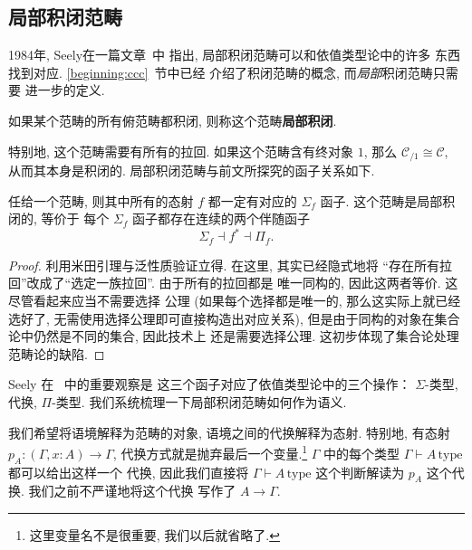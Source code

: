 \subsection{局部积闭范畴}
1984年, Seely在一篇文章~\cite{seely:1984:lccc}中
指出, 局部积闭范畴可以和依值类型论中的许多
东西找到对应. \ref{beginning:ccc}~节中已经
介绍了积闭范畴的概念, 而\emph{局部}积闭范畴只需要
进一步的定义.
\begin{definition}
如果某个范畴的所有俯范畴都积闭, 则称这个范畴\textbf{局部积闭}.
\end{definition}
特别地, 这个范畴需要有所有的拉回. 如果这个范畴含有终对象
\(1\), 那么 \(\mathcal C_{/1} \cong \mathcal C\),
从而其本身是积闭的. 局部积闭范畴与前文所探究的函子关系如下.
\begin{theorem}
任给一个范畴, 则其中所有的态射 \(f\) 都一定有对应的
\(\Sigma_f\) 函子. 这个范畴是局部积闭的, 等价于
每个 \(\Sigma_f\) 函子都存在连续的两个伴随函子
\[\Sigma_f\dashv f^*\dashv \Pi_f.\]
\end{theorem}
\begin{proof}
利用米田引理与泛性质验证立得. 在这里, 其实已经隐式地将
“存在所有拉回”改成了“选定一族拉回”. 由于所有的拉回都是
唯一同构的, 因此这两者等价. 这尽管看起来应当不需要选择
公理 (如果每个选择都是唯一的, 那么这实际上就已经选好了,
无需使用选择公理即可直接构造出对应关系),
但是由于同构的对象在集合论中仍然是不同的集合, 因此技术上
还是需要选择公理. 这初步体现了集合论处理范畴论的缺陷.
\end{proof}
Seely 在 \cite{seely:1984:lccc}~中的重要观察是
这三个函子对应了依值类型论中的三个操作：
\(\Sigma\)-类型, 代换, \(\Pi\)-类型.
我们系统梳理一下局部积闭范畴如何作为语义.

我们希望将语境解释为范畴的对象, 语境之间的代换解释为态射.
特别地, 有态射 \(p_A : (\Gamma, x{:}A) \to \Gamma\),
代换方式就是抛弃最后一个变量.\footnote{这里变量名不是很重要,
我们以后就省略了.} \(\Gamma\) 中的每个类型
\(\Gamma \vdash A\,\text{type}\) 都可以给出这样一个
代换, 因此我们直接将 \(\Gamma \vdash A\,\text{type}\)
这个判断解读为 \(p_A\) 这个代换. 我们之前不严谨地将这个代换
写作了 \(A \to \Gamma\).

